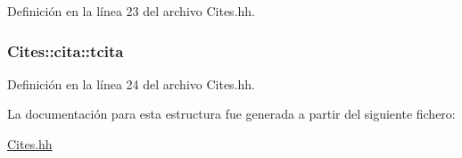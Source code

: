 Definición en la línea 23 del archivo Cites.\+hh.

\subsubsection[{\texorpdfstring{tcita}{tcita}}]{ Cites\+::cita\+::tcita}\hypertarget{struct_cites_1_1cita_a15992ff63124f90c1065a3c885c7d6dd}{}\label{struct_cites_1_1cita_a15992ff63124f90c1065a3c885c7d6dd}


Definición en la línea 24 del archivo Cites.\+hh.



La documentación para esta estructura fue generada a partir del siguiente fichero\+:\begin{DoxyCompactItemize}
\item 
\hyperlink{_cites_8hh}{Cites.\+hh}\end{DoxyCompactItemize}
